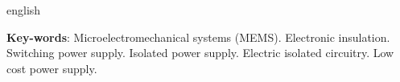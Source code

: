  \begin{resumo}[Abstract]
	\begin{otherlanguage*}{english}
	\lipsum[8]
    
 	\vspace{\onelineskip}
 
 	\noindent 
 	\textbf{Key-words}: Microelectromechanical systems (MEMS). Electronic insulation. Switching power supply. Isolated power supply. Electric isolated circuitry. Low cost power supply.
 \end{otherlanguage*}
 \end{resumo}

 

  
 

\listoffigures*
\cleardoublepage

